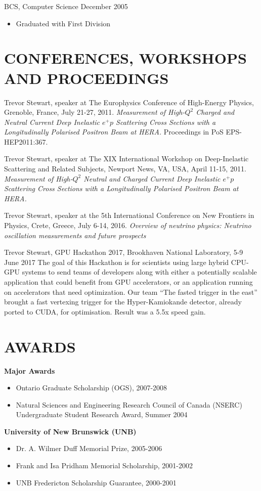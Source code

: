 \documentclass[margin]{res}
\begin{document}
\begin{resume}
BCS, Computer Science \hfill December 2005
\begin{itemize} \itemsep -2pt  %
\item Graduated with First Division 
\end{itemize}

\section{CONFERENCES, WORKSHOPS AND PROCEEDINGS}

Trevor Stewart, speaker at The Europhysics Conference of High-Energy Physics, Grenoble, France, July 21-27, 2011. \textit{Measurement of High-$Q^2$ Charged and Neutral Current Deep Inelastic $e^{+}p$ Scattering Cross Sections with a Longitudinally Polarised Positron Beam at HERA.} Proceedings in PoS EPS-HEP2011:367.

Trevor Stewart, speaker at The XIX International Workshop on Deep-Inelastic Scattering and Related Subjects, Newport News, VA, USA, April 11-15, 2011. \textit{Measurement of High-$Q^2$ Neutral and Charged Current Deep Inelastic $e^+p$ Scattering Cross Sections with a Longitudinally Polarised Positron Beam at HERA.}

Trevor Stewart, speaker at the 5th International Conference on New Frontiers in Physics, Crete, Greece, July 6-14, 2016. \textit{Overview of neutrino physics: Neutrino oscillation measurements and future prospects}

Trevor Stewart, GPU Hackathon 2017, Brookhaven National Laboratory, 5-9 June 2017
The goal of this Hackathon is for scientists using large hybrid CPU-GPU systems to send teams of developers along with either a potentially scalable application that could benefit from GPU accelerators, or an application running on accelerators that need optimization.
Our team ``The fasted trigger in the east'' brought a fast vertexing trigger for the Hyper-Kamiokande detector, already ported to CUDA, for optimisation. Result was a 5.5x speed gain. 

\section{AWARDS}

\textbf{Major Awards}\\
\begin{itemize}
\item Ontario Graduate Scholarship (OGS), 2007-2008
\item Natural Sciences and Engineering Research Council of Canada (NSERC) Undergraduate Student Research Award, Summer 2004
\end{itemize}
\textbf{University of New Brunswick (UNB)}\\
\begin{itemize}
\item Dr. A. Wilmer Duff Memorial Prize, 2005-2006
\item Frank and  Isa  Pridham Memorial Scholarship, 2001-2002
\item UNB Fredericton Scholarship Guarantee, 2000-2001
\end{itemize}


\end{resume}
\end{document}
